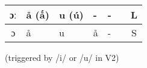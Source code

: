 \documentclass[a4paper,12pt,landscape]{scrartcl}%
\begin{document}
\begin{tabularx}{\textwidth}{ |c| Y |Y|Y|Y|l|c|}
ɔː			&å (ǻ)	&u (ú)		&-		&-		&	 	&L\\\hline %
ɔ			&å		&u			&å		&-		&		& S	\\\hline





\end{tabularx}

\smallskip
{ (triggered by /i/ or /u/ in V2)\hfill}

\vfill
\tiny
{}
\end{document}
